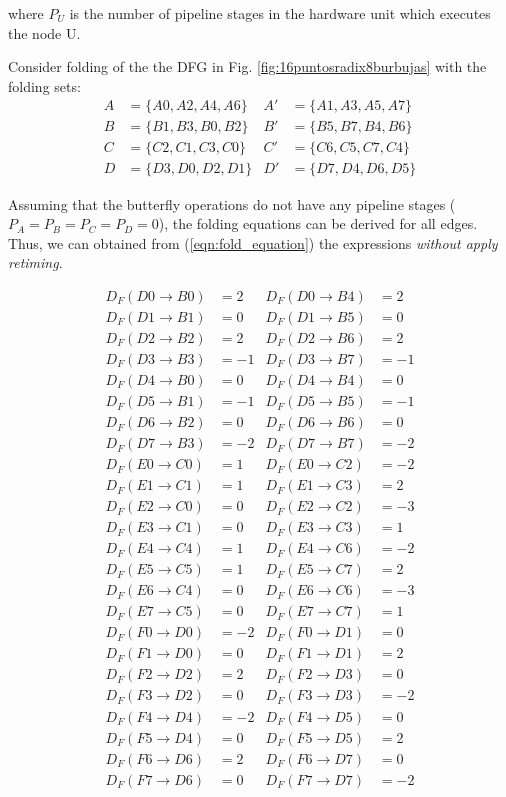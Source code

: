 \documentclass[journal,comsoc]{IEEEtran}
\begin{document}
where $P_U$ is the number of pipeline stages in the hardware unit which executes the node U.

Consider folding of the the DFG in Fig. \ref{fig:16puntosradix8burbujas} with the folding sets:
\begin{align*}%
A&= \{ A0,A2,A4,A6 \}  & A'&= \{ A1,A3,A5,A7 \} \\
B&=\{ B1,B3,B0,B2 \}   &B'&=\{ B5,B7,B4,B6 \} 	\\
C&=\{ C2,C1,C3,C0 \}   &C'&=\{ C6,C5,C7,C4 \} 	\\ 
D&=\{ D3,D0,D2,D1 \}   &D'&=\{ D7,D4,D6,D5 \}  
\end{align*}

Assuming that the butterfly operations do not have any pipeline stages ($P_A=P_B=P_C=P_D=0$), the folding equations can be derived for all edges. Thus, we can obtained from (\ref{eqn:fold_equation}) the expressions \textit{without apply retiming}.
\begin{small}
\begin{align*}
D_F(D0\to B0)&=2 &  D_F(D0\to B4)&=2\\
D_F(D1\to B1)&=0 &  D_F(D1\to B5)&=0\\
D_F(D2\to B2)&=2 &  D_F(D2\to B6)&=2\\
D_F(D3\to B3)&=-1& D_F(D3\to B7)&=-1\\
D_F(D4\to B0)&=0 &  D_F(D4\to B4)&=0\\
D_F(D5\to B1)&=-1& D_F(D5\to B5)&=-1\\
D_F(D6\to B2)&=0 &  D_F(D6\to B6)&=0\\
D_F(D7\to B3)&=-2& D_F(D7\to B7)&=-2\\
D_F(E0\to C0)&=1 &  D_F(E0\to C2)&=-2\\
D_F(E1\to C1)&=1 &  D_F(E1\to C3)&=2\\
D_F(E2\to C0)&=0 &  D_F(E2\to C2)&=-3\\
D_F(E3\to C1)&=0 &  D_F(E3\to C3)&=1\\
D_F(E4\to C4)&=1 &  D_F(E4\to C6)&=-2\\
D_F(E5\to C5)&=1 &  D_F(E5\to C7)&=2\\
D_F(E6\to C4)&=0 &  D_F(E6\to C6)&=-3\\
D_F(E7\to C5)&=0 &  D_F(E7\to C7)&=1\\
D_F(F0\to D0)&=-2& D_F(F0\to D1)&=0\\
D_F(F1\to D0)&=0 &  D_F(F1\to D1)&=2\\
D_F(F2\to D2)&=2 &  D_F(F2\to D3)&=0\\
D_F(F3\to D2)&=0 &  D_F(F3\to D3)&=-2\\
D_F(F4\to D4)&=-2&  D_F(F4\to D5)&=0\\
D_F(F5\to D4)&=0 &  D_F(F5\to D5)&=2\\
D_F(F6\to D6)&=2 &  D_F(F6\to D7)&=0\\
D_F(F7\to D6)&=0 &  D_F(F7\to D7)&=-2
\end{align*}
\end{small}
\end{document}
